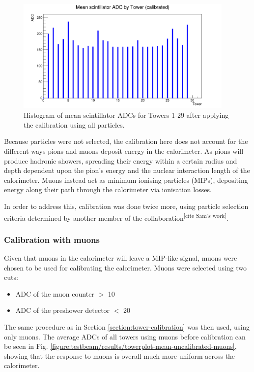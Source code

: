 \begin{figure}[hp]
	\centering
	\includegraphics[width=0.95\textwidth]{../Pictures/IDEA/Calibration/new-towerplot-all-cal.png}
	\caption{Histogram of mean scintillator \acrshort{ADC}s for Towers 1-29 after applying the calibration using all particles.}
	\label{figure:testbeam/results/towerplot-mean-calibrated-all}
\end{figure}

Because particles were not selected, the calibration here does not account for the different ways pions and muons deposit energy in the calorimeter. As pions will produce hadronic showers, spreading their energy within a certain radius and depth dependent upon the pion's energy and the nuclear interaction length of the calorimeter. Muons instead act as minimum ionising particles (\acrshort{MIP}s), depositing energy along their path through the calorimeter via ionisation losses.

In order to address this, calibration was done twice more, using particle selection criteria determined by another member of the collaboration\textsuperscript{[cite Sam's work]}.

\subsubsection{Calibration with muons}
Given that muons in the calorimeter will leave a \acrshort{MIP}-like signal, muons were chosen to be used for calibrating the calorimeter. Muons were selected using two cuts: 

\begin{itemize}
	\item ADC of the muon counter $>$ 10
	\item ADC of the preshower detector $<$ 20
\end{itemize}

The same procedure as in Section \ref{section:tower-calibration} was then used, using only muons. The average ADCs of all towers using muons before calibration can be seen in Fig. \ref{figure:testbeam/results/towerplot-mean-uncalibrated-muons}, showing that the response to muons is overall much more uniform across the calorimeter.

